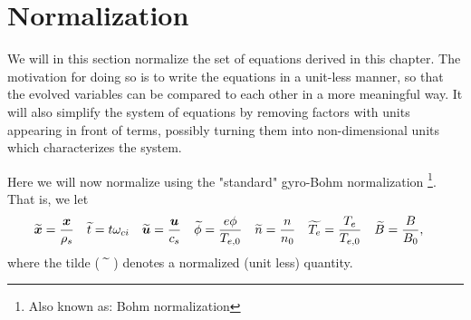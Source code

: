 \section{Normalization}
\label{sec:norm}
We will in this section normalize the set of equations derived in this chapter.
The motivation for doing so is to write the equations in a unit-less manner, so that the evolved variables can be compared to each other in a more meaningful way.
It will also simplify the system of equations by removing factors with units appearing in front of terms, possibly turning them into non-dimensional units which characterizes the system.

Here we will now normalize using the "standard" gyro-Bohm normalization%
%
\footnote{Also known as: Bohm normalization}.%
%
That is, we let
%
\begin{align*}
    &\widetilde{ \boldsymbol{x}} = \frac{\boldsymbol{x}}{\rho_s}&
    &\widetilde{ t}      = t\omega_{ci}&
    &\widetilde{ \boldsymbol{u}} = \frac{\boldsymbol{u}}{c_s}&
    &\widetilde{ \phi}   = \frac{e\phi}{T_{e,0}}&
    &\widetilde{ n}      = \frac{n}{n_{0}}&
    &\widetilde{ T_e}    = \frac{T_e}{T_{e,0}}&
    &\widetilde{ B}      = \frac{B}{B_0},&
\end{align*}
%
where the tilde ($\widetilde{ \quad}$) denotes a normalized (unit less) quantity.

